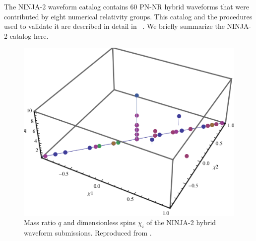 \documentclass[12pt]{iopart}
\begin{document}
The NINJA-2 waveform catalog contains 60 PN-NR hybrid waveforms that 
were contributed by eight numerical relativity groups.  This catalog and the 
procedures used to validate it are described in detail in
~\cite{Ajith:2012az}. We briefly summarize the NINJA-2 catalog 
here.

\begin{figure} 
\centerline{\includegraphics[width=0.95\linewidth]
{figure1.png}}
  \caption[Parameters of the NINJA-2 submissions]{
  \label{fig:ParameterSpace}
Mass ratio $q$ and dimensionless spins $\chi_i$ of the NINJA-2 hybrid
waveform submissions. Reproduced from \cite{Ajith:2012az}.
}
\end{figure}
\end{document}
